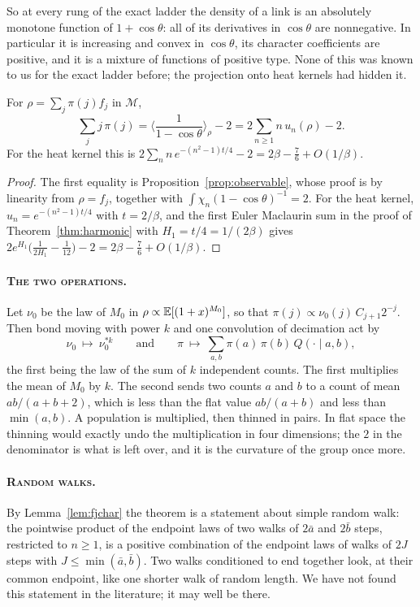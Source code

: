 So at every rung of the exact ladder the density of a link is an absolutely monotone function of $1+\cos\theta$: all of its derivatives in $\cos\theta$ are nonnegative. In particular it is increasing and convex in $\cos\theta$, its character coefficients are positive, and it is a mixture of functions of positive type. None of this was known to us for the exact ladder before; the projection onto heat kernels had hidden it.

\begin{corollary}\label{cor:meancount}
For $\rho=\sum_j\pi(j)f_j$ in $\mathcal M$,
\[
\sum_jj\,\pi(j)=\Big\langle\frac1{1-\cos\theta}\Big\rangle_\rho-2=2\sum_{n\ge1}n\,u_n(\rho)-2 .
\]
For the heat kernel this is $2\sum_nn\,e^{-(n^2-1)t/4}-2=2\beta-\frac76+O(1/\beta)$.
\end{corollary}

\begin{proof}
The first equality is Proposition~\ref{prop:observable}, whose proof is by linearity from $\rho=f_j$, together with $\int\chi_n(1-\cos\theta)^{-1}=2$. For the heat kernel, $u_n=e^{-(n^2-1)t/4}$ with $t=2/\beta$, and the first Euler Maclaurin sum in the proof of Theorem~\ref{thm:harmonic} with $H_1=t/4=1/(2\beta)$ gives $2e^{H_1}\big(\frac1{2H_1}-\frac1{12}\big)-2=2\beta-\frac76+O(1/\beta)$.
\end{proof}

\paragraph{\normalfont\scshape The two operations.} Let $\nu_0$ be the law of $M_0$ in $\rho\propto\mathbb{E}[(1+x)^{M_0}]$, so that $\pi(j)\propto\nu_0(j)\,C_{j+1}2^{-j}$. Then bond moving with power $k$ and one convolution of decimation act by
\[
\nu_0\ \longmapsto\ \nu_0^{*k}\qquad\text{and}\qquad\pi\ \longmapsto\ \sum_{a,b}\pi(a)\,\pi(b)\,Q(\cdot\mid a,b),
\]
the first being the law of the sum of $k$ independent counts. The first multiplies the mean of $M_0$ by $k$. The second sends two counts $a$ and $b$ to a count of mean $ab/(a+b+2)$, which is less than the flat value $ab/(a+b)$ and less than $\min(a,b)$. A population is multiplied, then thinned in pairs. In flat space the thinning would exactly undo the multiplication in four dimensions; the $2$ in the denominator is what is left over, and it is the curvature of the group once more.

\paragraph{\normalfont\scshape Random walks.} By Lemma~\ref{lem:fjchar} the theorem is a statement about simple random walk: the pointwise product of the endpoint laws of two walks of $2\bar a$ and $2\bar b$ steps, restricted to $n\ge1$, is a positive combination of the endpoint laws of walks of $2J$ steps with $J\le\min(\bar a,\bar b)$. Two walks conditioned to end together look, at their common endpoint, like one shorter walk of random length. We have not found this statement in the literature; it may well be there.

